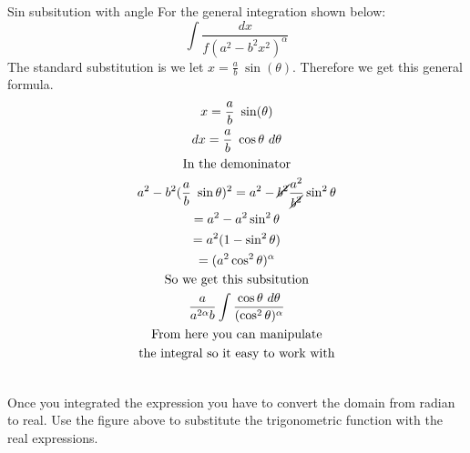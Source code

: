\documentclass[letterpaper,10pt,twoside,twocolumn,openany]{book}
\begin{document}
\newpage
\begin{paperbox}[]{Sin subsitution with angle}
    For the general integration shown below:
    \begin{equation}
        \int \frac{dx}{f(a^2-b^2x^2)^\alpha}
    \end{equation}
    The standard substitution is we let $x = \frac{a}{b}\ \sin(\theta)$. Therefore we get this general formula.
    \begin{gather*}
        x = \frac{a}{b}\ \sin(\theta)\\
        dx =  \frac{a}{b}\ \cos\theta\ d\theta\\
        \text{In the demoninator}\\
        a^2 - b^2 (\frac{a}{b}\ \sin\theta)^2 = a^2 - \cancel{b^2} \frac{a^2}{\cancel{b^2}}\sin^2\theta\\
        = a^2 - a^2 \sin^2\theta\\
        = a^2(1 - \sin^2\theta)\\
        = (a^2 \cos^2\theta)^\alpha\\
        \text{So we get this subsitution}\\
        \frac{a}{a^{2\alpha}b} \int \frac{\cos\theta\ d\theta}{(\cos^2\theta)^\alpha}\\
        \text{From here you can manipulate}\\
        \text{the integral so it easy to work with}
    \end{gather*}

    \centering
    \\
    Once you integrated the expression you have to convert the domain from radian to real. Use the figure above to substitute the trigonometric function with the real expressions.
\end{paperbox}
\end{document}
